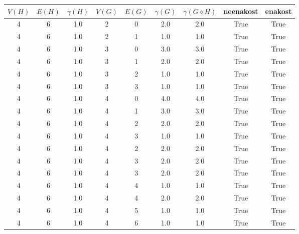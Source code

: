 \documentclass[a4paper,12pt]{article}
\begin{document}
\begin{center}
    \begin{tabular}{ c c c | c c c | c | c | c}
        $V(H)$ & $E(H)$ & $\gamma(H)$ & $V(G)$ & $E(G)$ & $\gamma(G)$ & $\gamma(G \diamond H)$ & neenakost & enakost \\
        \hline
        4 & 6 & 1.0 & 2 & 0 & 2.0 & 2.0 & True & True     \\
        4 & 6 & 1.0 & 2 & 1 & 1.0 & 1.0 & True & True     \\
        4 & 6 & 1.0 & 3 & 0 & 3.0 & 3.0 & True & True     \\
        4 & 6 & 1.0 & 3 & 1 & 2.0 & 2.0 & True & True     \\
        4 & 6 & 1.0 & 3 & 2 & 1.0 & 1.0 & True & True     \\
        4 & 6 & 1.0 & 3 & 3 & 1.0 & 1.0 & True & True     \\
        4 & 6 & 1.0 & 4 & 0 & 4.0 & 4.0 & True & True     \\
        4 & 6 & 1.0 & 4 & 1 & 3.0 & 3.0 & True & True     \\
        4 & 6 & 1.0 & 4 & 2 & 2.0 & 2.0 & True & True     \\
        4 & 6 & 1.0 & 4 & 3 & 1.0 & 1.0 & True & True     \\
        4 & 6 & 1.0 & 4 & 2 & 2.0 & 2.0 & True & True     \\
        4 & 6 & 1.0 & 4 & 3 & 2.0 & 2.0 & True & True     \\
        4 & 6 & 1.0 & 4 & 3 & 2.0 & 2.0 & True & True     \\
        4 & 6 & 1.0 & 4 & 4 & 1.0 & 1.0 & True & True     \\
        4 & 6 & 1.0 & 4 & 4 & 2.0 & 2.0 & True & True     \\
        4 & 6 & 1.0 & 4 & 5 & 1.0 & 1.0 & True & True     \\
        4 & 6 & 1.0 & 4 & 6 & 1.0 & 1.0 & True & True     \\
    \end{tabular}
\end{center}
\end{document}
